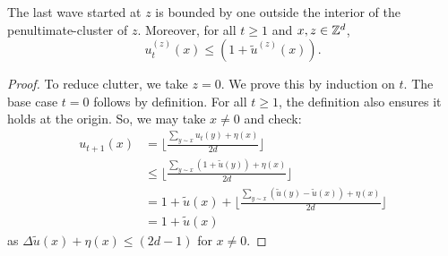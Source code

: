 \documentclass[12pt]{amsart}
\begin{document}
\begin{lemma} \label{lemma:last_wave_bound}
	The last wave started at $z$ is bounded by one outside the interior of the penultimate-cluster of $z$. Moreover, for all $t \geq 1$ and $x,z \in \mathbb{Z}^d$, 
	\[
	u_t^{(z)}(x) \leq (1 + \tilde{u}^{(z)}(x)).
	\]
\end{lemma}

\begin{proof}
	To reduce clutter, we take $z = 0$. We prove this by induction on $t$. 
	The base case $t=0$ follows by definition. For all $t \geq 1$, the definition also ensures it holds at the origin.
	So, we may take $x \not = 0$ and check:
	\begin{align*}
	u_{t+1}(x) &= \lfloor \frac{ \sum_{y \sim x}  u_{t}(y) + \eta(x)}{2 d} \rfloor \\
	&\leq \lfloor \frac{ \sum_{y \sim x} (1 + \tilde{u}(y)) + \eta(x)}{2 d} \rfloor \\
	&= 1 + \tilde{u}(x) + \lfloor \frac{ \sum_{y \sim x} (\tilde{u}(y)-\tilde{u}(x)) + \eta(x)}{2 d} \rfloor \\
	&= 1 + \tilde{u}(x)
	\end{align*}
	as $\Delta \tilde{u}(x) + \eta(x) \leq (2 d- 1)$ for $x \not = 0$. 
	
	
	
	
	
	
	
\end{proof}
\end{document}
